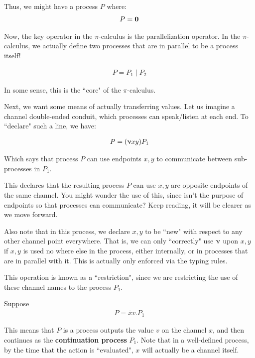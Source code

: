 Thus, we might have a process $P$ where:
\begin{align*}
    P = \textbf{0}
\end{align*}


Now, the key operator in the $\pi$-calculus is the parallelization operator. In the $\pi$-calculus, we actually define two processes that are in parallel to be a process itself!

\begin{align*}
    P = P_1 \mid P_2
\end{align*}

In some sense, this is the ``core" of the $\pi$-calculus.

Next, we want some means of actually transferring values. Let us imagine a channel double-ended conduit, which processes can speak/listen at each end. To ``declare" such a line, we have:

\begin{align*}
P = (\upnu xy)P_1
\end{align*}

Which says that process $P$ can use endpoints $x,y$ to communicate between sub-processes in $P_1$.

This declares that the resulting process $P$ can use $x,y$ are opposite endpoints of the same channel. You might wonder the use of this, since isn't the purpose of endpoints so that processes can communicate? Keep reading, it will be clearer as we move forward.

Also note that in this process, we declare $x,y$ to be ``new" with respect to any other channel point everywhere. That is, we can only ``correctly" use $\upnu$ upon $x,y$ if $x,y$ is used no where else in the process, either internally, or in processes that are in parallel with it. This is actually only enforced via the typing rules.

This operation is known as a ``restriction", since we are restricting the use of these channel names to the process $P_1$.

Suppose
\begin{align*}
    P = \bar{x}v.P_1
\end{align*}

This means that $P$ is a process outputs the value $v$ on the channel $x$, and then continues as the \textbf{continuation process} $P_1$. Note that in a well-defined process, by the time that the action is ``evaluated", $x$ will actually be a channel itself.

